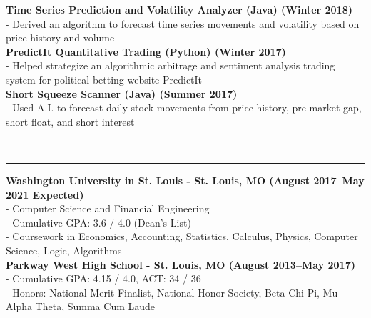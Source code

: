 \documentclass[11pt]{article}
\begin{document}
\begin{titlepage}
\begin{addmargin}[1em]{0em}
			\textbf{Time Series Prediction and Volatility Analyzer (Java) \hfill (Winter 2018)}\\
- Derived an algorithm to forecast time series movements and volatility based on price history and volume \\
			\textbf{PredictIt Quantitative Trading (Python) \hfill (Winter 2017)}\\
- Helped strategize an algorithmic arbitrage and sentiment analysis trading system for political betting website PredictIt \\
			\textbf{Short Squeeze Scanner (Java) \hfill (Summer 2017)}\\
- Used A.I. to forecast daily stock movements from price history, pre-market gap, short float, and short interest\\
		\end{addmargin}
		\vspace{-10pt}
		\noindent
		\\\rule{\textwidth}{0.4pt}
		\begin{addmargin}[1em]{0em}
			\textbf{Washington University in St. Louis - St. Louis, MO \hfill (August 2017–May 2021 Expected)}\\
- Computer Science and Financial Engineering\\
- Cumulative GPA: 3.6 / 4.0 (Dean's List)\\
- Coursework in Economics, Accounting, Statistics, Calculus, Physics, Computer Science, Logic, Algorithms \\
			\textbf{Parkway West High School - St. Louis, MO \hfill (August 2013–May 2017)}\\
- Cumulative GPA: 4.15 / 4.0, ACT: 34 / 36\\
- Honors: National Merit Finalist, National Honor Society, Beta Chi Pi, Mu Alpha Theta, Summa Cum Laude \\
		\end{addmargin}
	\end{titlepage}
\end{document}
